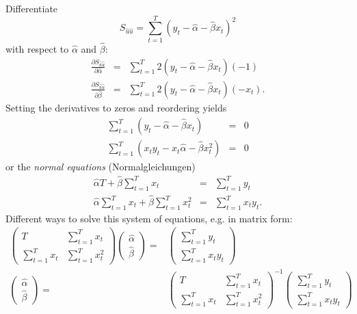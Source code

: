 \documentclass{article}
\begin{document}
Differentiate%
\[
S_{\hat{u}\hat{u}}=\sum_{t=1}^{T}\left( y_{t}-\hat{\alpha}-\hat{\beta}%
x_{t}\right) ^{2} 
\]%
with respect to $\hat{\alpha}$ and $\hat{\beta}$:%
\begin{eqnarray*}
	\frac{\partial S_{\hat{u}\hat{u}}}{\partial \hat{\alpha}} &=&\sum_{t=1}^{T}2%
	\left( y_{t}-\hat{\alpha}-\hat{\beta}x_{t}\right) \left( -1\right) \\
	\frac{\partial S_{\hat{u}\hat{u}}}{\partial \hat{\beta}} &=&\sum_{t=1}^{T}2%
	\left( y_{t}-\hat{\alpha}-\hat{\beta}x_{t}\right) \left( -x_{t}\right) .
\end{eqnarray*}%
Setting the derivatives to zeros and reordering yields%
\begin{eqnarray*}
	\sum_{t=1}^{T}\left( y_{t}-\hat{\alpha}-\hat{\beta}x_{t}\right) &=&0 \\
	\sum_{t=1}^{T}\left( x_{t}y_{t}-x_{t}\hat{\alpha}-\hat{\beta}%
	x_{t}^{2}\right) &=&0
\end{eqnarray*}%
or the \emph{normal equations }(Normalgleichungen)%
\begin{eqnarray}
\hat{\alpha}T+\hat{\beta}\sum_{t=1}^{T}x_{t} &=&\sum_{t=1}^{T}y_{t}
\label{g1} \\
\hat{\alpha}\sum_{t=1}^{T}x_{t}+\hat{\beta}\sum_{t=1}^{T}x_{t}^{2}
&=&\sum_{t=1}^{T}x_{t}y_{t}.  \label{g2}
\end{eqnarray}%
Different ways to solve this system of equations, e.g. in matrix form:
\begin{align*}
\begin{pmatrix} T & \sum_{t=1}^{T}x_{t}\\ \sum_{t=1}^{T}x_{t} & \sum_{t=1}^{T}x_{t}^2\end{pmatrix} \begin{pmatrix} \hat{\alpha} \\ \hat{\beta} \end{pmatrix} =& \begin{pmatrix} \sum_{t=1}^{T}y_{t}\\ \sum_{t=1}^{T}x_t y_{t}\end{pmatrix}\\
\begin{pmatrix} \hat{\alpha} \\ \hat{\beta} \end{pmatrix} =& \begin{pmatrix} T & \sum_{t=1}^{T}x_{t}\\ \sum_{t=1}^{T}x_{t} & \sum_{t=1}^{T}x_{t}^2\end{pmatrix}^{-1}  \begin{pmatrix} \sum_{t=1}^{T}y_{t}\\ \sum_{t=1}^{T}x_t y_{t}\end{pmatrix}
\end{align*}
\end{document}

